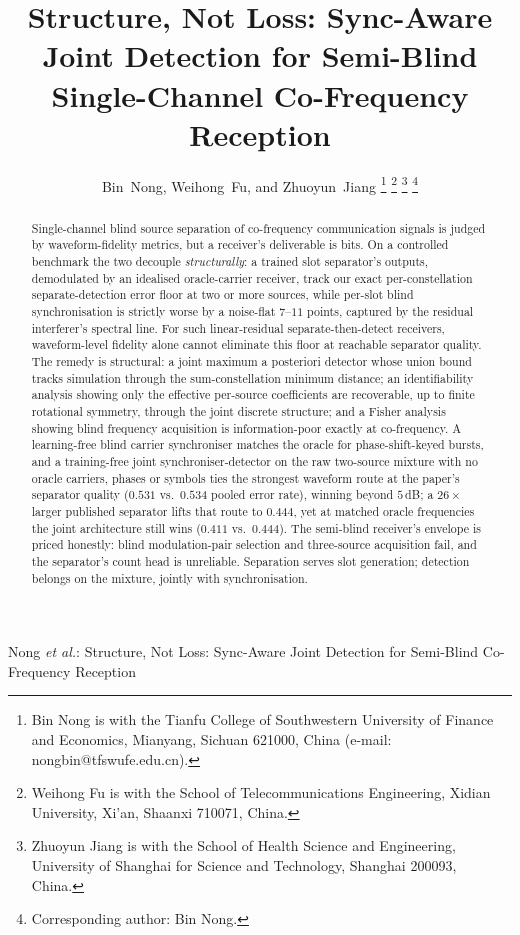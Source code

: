 \documentclass[journal]{IEEEtran}
\begin{document}
\title{Structure, Not Loss: Sync-Aware Joint Detection for
Semi-Blind Single-Channel Co-Frequency Reception}

\author{Bin~Nong, Weihong~Fu, and Zhuoyun~Jiang%
\thanks{Bin Nong is with the Tianfu College of Southwestern University
of Finance and Economics, Mianyang, Sichuan 621000, China (e-mail:
nongbin@tfswufe.edu.cn).}%
\thanks{Weihong Fu is with the School of Telecommunications
Engineering, Xidian University, Xi'an, Shaanxi 710071, China.}%
\thanks{Zhuoyun Jiang is with the School of Health Science and
Engineering, University of Shanghai for Science and Technology,
Shanghai 200093, China.}%
\thanks{Corresponding author: Bin Nong.}}

%
{Nong \MakeLowercase{\textit{et al.}}: Structure, Not Loss: Sync-Aware
Joint Detection for Semi-Blind Co-Frequency Reception}

\maketitle

\begin{abstract}
Single-channel blind source separation of co-frequency communication
signals is judged by waveform-fidelity metrics, but a receiver's
deliverable is bits. On a controlled benchmark the two
decouple \emph{structurally}: a trained slot separator's outputs,
demodulated by an idealised oracle-carrier receiver, track our exact
per-constellation separate-detection error floor at two or more
sources, while per-slot
blind synchronisation is strictly worse by a noise-flat $7$--$11$
points, captured by the residual interferer's spectral line. For such
linear-residual separate-then-detect receivers, waveform-level fidelity
alone cannot eliminate this floor at reachable separator quality. The
remedy is structural: a joint maximum a posteriori detector whose union
bound tracks simulation through the sum-constellation minimum distance;
an identifiability analysis showing only the effective per-source
coefficients are recoverable, up to finite rotational symmetry, through
the joint discrete structure; and a Fisher analysis showing blind
frequency acquisition is information-poor exactly at co-frequency. A
learning-free blind carrier synchroniser matches the oracle for
phase-shift-keyed bursts, and a training-free joint
synchroniser-detector on the raw two-source mixture with no oracle
carriers, phases or symbols ties the strongest waveform route at the
paper's separator quality ($0.531$ vs.\ $0.534$ pooled error rate), winning beyond $5$\,dB; a $26\times$ larger published
separator lifts that route to $0.444$, yet at matched oracle
frequencies the joint architecture still wins ($0.411$ vs.\ $0.444$).
The semi-blind receiver's envelope is priced honestly: blind
modulation-pair selection and three-source acquisition fail, and the
separator's count head is unreliable. Separation serves slot
generation; detection belongs on the mixture, jointly with
synchronisation.
\end{abstract}
\end{document}
